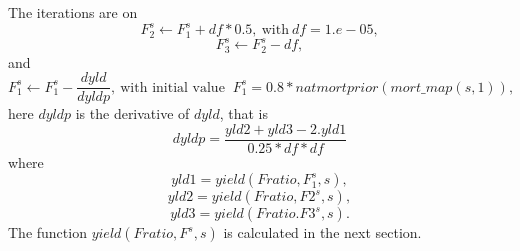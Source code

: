 \documentclass{article}
\begin{document}
    The iterations are on
    \begin{equation}
        F_2^s \leftarrow F_1^s + df*0.5, \ \text{with}  \ df=1.e-05,
    \end{equation}
    \begin{equation}
        F_3^s\leftarrow F_2^s-df,
    \end{equation}
and
\begin{equation}
    F_1^s\leftarrow F_1^s-\dfrac{dyld}{dyldp}, \ \text{with initial value } \ F_1^s=0.8*natmortprior(mort\_map(s,1)),
\end{equation}
    here $dyldp$ is the derivative of $dyld$, that is
\begin{equation}
    dyldp=\dfrac{yld2+yld3 - 2.yld1}{0.25*df*df}
\end{equation}
where
\begin{equation}
    yld1=yield(Fratio,F_1^s,s),
\end{equation}
\begin{equation}
    yld2=yield(Fratio,F2^s,s),
\end{equation}
\begin{equation}
    yld3=yield(Fratio.F3^s,s).
\end{equation}
The function $yield(Fratio,F^s,s)$ is calculated in the next section.\\
\end{document}
